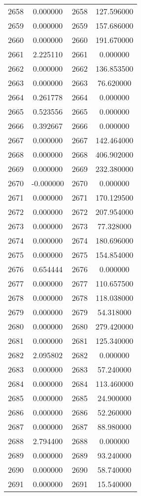 \documentclass[12pt]{article}
\begin{document}
\begin{longtable}{@{}cccc@{}}
2658 & 0.000000 & 2658 & 127.596000 \\
2659 & 0.000000 & 2659 & 157.686000 \\
2660 & 0.000000 & 2660 & 191.670000 \\
2661 & 2.225110 & 2661 & 0.000000 \\
2662 & 0.000000 & 2662 & 136.853500 \\
2663 & 0.000000 & 2663 & 76.620000 \\
2664 & 0.261778 & 2664 & 0.000000 \\
2665 & 0.523556 & 2665 & 0.000000 \\
2666 & 0.392667 & 2666 & 0.000000 \\
2667 & 0.000000 & 2667 & 142.464000 \\
2668 & 0.000000 & 2668 & 406.902000 \\
2669 & 0.000000 & 2669 & 232.380000 \\
2670 & -0.000000 & 2670 & 0.000000 \\
2671 & 0.000000 & 2671 & 170.129500 \\
2672 & 0.000000 & 2672 & 207.954000 \\
2673 & 0.000000 & 2673 & 77.328000 \\
2674 & 0.000000 & 2674 & 180.696000 \\
2675 & 0.000000 & 2675 & 154.854000 \\
2676 & 0.654444 & 2676 & 0.000000 \\
2677 & 0.000000 & 2677 & 110.657500 \\
2678 & 0.000000 & 2678 & 118.038000 \\
2679 & 0.000000 & 2679 & 54.318000 \\
2680 & 0.000000 & 2680 & 279.420000 \\
2681 & 0.000000 & 2681 & 125.340000 \\
2682 & 2.095802 & 2682 & 0.000000 \\
2683 & 0.000000 & 2683 & 57.240000 \\
2684 & 0.000000 & 2684 & 113.460000 \\
2685 & 0.000000 & 2685 & 24.900000 \\
2686 & 0.000000 & 2686 & 52.260000 \\
2687 & 0.000000 & 2687 & 88.980000 \\
2688 & 2.794400 & 2688 & 0.000000 \\
2689 & 0.000000 & 2689 & 93.240000 \\
2690 & 0.000000 & 2690 & 58.740000 \\
2691 & 0.000000 & 2691 & 15.540000 \\

\end{longtable}
\end{document}
